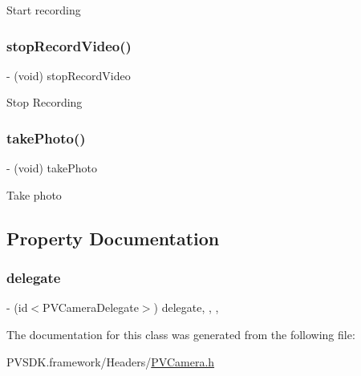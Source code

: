 Start recording \mbox{\label{interface_p_v_camera_a36365b2f0c0896ed0552244fccdb9ebe}} 
\subsubsection{\texorpdfstring{stop\+Record\+Video()}{stopRecordVideo()}}
{\footnotesize\ttfamily -\/ (void) stop\+Record\+Video \begin{DoxyParamCaption}{ }\end{DoxyParamCaption}}

Stop Recording \mbox{\label{interface_p_v_camera_ab2d9992ae6facf16efa63a7effa2e461}} 
\subsubsection{\texorpdfstring{take\+Photo()}{takePhoto()}}
{\footnotesize\ttfamily -\/ (void) take\+Photo \begin{DoxyParamCaption}{ }\end{DoxyParamCaption}}

Take photo 

\subsection{Property Documentation}
\mbox{\label{interface_p_v_camera_a34581adb3bd0cb12122ac7ea80ec57ed}} 
\subsubsection{\texorpdfstring{delegate}{delegate}}
{\footnotesize\ttfamily -\/ (id$<$P\+V\+Camera\+Delegate$>$) delegate\hspace{0.3cm}{\ttfamily [read]}, {\ttfamily [write]}, {\ttfamily [nonatomic]}, {\ttfamily [weak]}}



The documentation for this class was generated from the following file\+:\begin{DoxyCompactItemize}
\item 
P\+V\+S\+D\+K.\+framework/\+Headers/\hyperlink{_p_v_camera_8h}{P\+V\+Camera.\+h}\end{DoxyCompactItemize}
